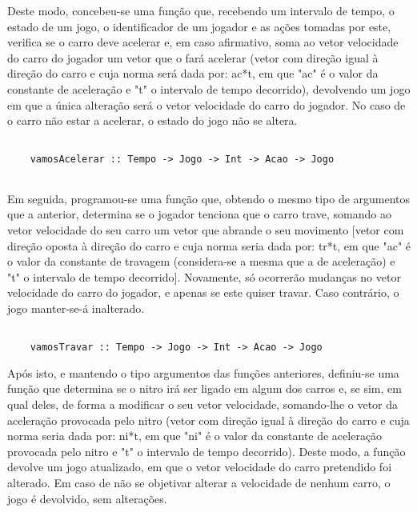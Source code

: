\documentclass[a4paper]{report} %
\begin{document}
  \hspace{1cm}
  
  \par \noindent Deste modo, concebeu-se uma função que, recebendo um intervalo de tempo, o estado de um jogo, o identificador de um jogador e as ações tomadas por este, verifica se o carro deve acelerar e, em caso afirmativo, soma ao vetor velocidade do carro do jogador um vetor que o fará acelerar (vetor com direção igual à direção do carro e cuja norma será dada por: ac*t, em que "ac" é o valor da constante de aceleração e "t" o intervalo de tempo decorrido), devolvendo um jogo em que a única alteração será o vetor velocidade do carro do jogador. No caso de o carro não estar a acelerar, o estado do jogo não se altera. 
  
  \begin{verbatim}
      
    vamosAcelerar :: Tempo -> Jogo -> Int -> Acao -> Jogo
      
  \end{verbatim}

  \par \noindent Em seguida, programou-se uma função que, obtendo o mesmo tipo de argumentos que a anterior, determina se o jogador tenciona que o carro trave, somando ao vetor velocidade do seu carro um vetor que abrande o seu movimento [vetor com direção oposta à direção do carro e cuja norma seria dada por: tr*t, em que "ac" é o valor da constante de travagem (considera-se a mesma que a de aceleração) e "t" o intervalo de tempo decorrido]. Novamente, só ocorrerão mudanças no vetor velocidade do carro do jogador, e apenas se este quiser travar. Caso contrário, o jogo manter-se-á inalterado.

  \begin{verbatim}

    vamosTravar :: Tempo -> Jogo -> Int -> Acao -> Jogo

  \end{verbatim}

  \par \noindent Após isto, e mantendo o tipo argumentos das funções anteriores, definiu-se uma função que determina se o nitro irá ser ligado em algum dos carros e, se sim, em qual deles, de forma a modificar o seu vetor velocidade, somando-lhe o vetor da aceleração provocada pelo nitro (vetor com direção igual à direção do carro e cuja norma seria dada por: ni*t, em que "ni" é o valor da constante de aceleração provocada pelo nitro e "t" o intervalo de tempo decorrido). Deste modo, a função devolve um jogo atualizado, em que o vetor velocidade do carro pretendido foi alterado. Em caso de não se objetivar alterar a velocidade de nenhum carro, o jogo é devolvido, sem alterações.
  
\end{document}
